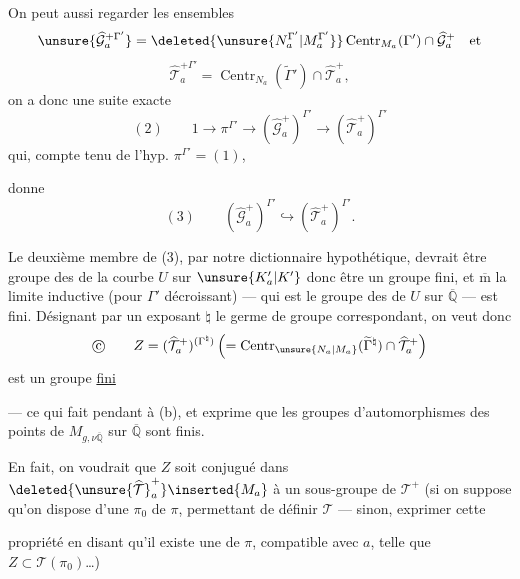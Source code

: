 On peut aussi regarder les ensembles
\[
\unsure{\widehat{\mathcal G}_a^{+\Gamma'}}
=
\deleted{\unsure{N_a^{\Gamma'}|M_a^{\Gamma'}}}
\operatorname{Centr}_{M_a}(\Gamma')\cap\widehat{\mathcal G}_a^+
\quad\text{et}
\]
\[
\widehat{\mathcal T}_a^{+\Gamma'}
=\operatorname{Centr}_{N_a}(\widetilde{\Gamma}')\cap\widehat{\mathcal T}_a^+,
\]
 on a donc une suite exacte
\[
(2)\qquad 1\longrightarrow\pi^{\Gamma'}\longrightarrow
(\widehat{\mathcal G}_a^+)^{\Gamma'}\longrightarrow
(\widehat{\mathcal T}_a^+)^{\Gamma'}
\]
qui, compte tenu de l'hyp. $\pi^{\Gamma'}=(1)$,


donne
\[
(3)\qquad (\widehat{\mathcal G}_a^+)^{\Gamma'}
\hookrightarrow (\widehat{\mathcal T}_a^+)^{\Gamma'}.
\]

Le deuxième membre de (3), par notre dictionnaire hypothétique, devrait être   groupe des  de la courbe $U$ sur $\unsure{K'_a|K'}$ donc être un groupe fini, et $\overline{\mathrm m}$  la limite inductive (pour $\Gamma'$ décroissant) --- qui est le groupe des  de $U$ sur $\overline{\mathbb Q}$ --- est fini. Désignant par un exposant $\natural$ le germe de groupe correspondant, on veut donc
\[
\text{\textcircled{c}}\qquad
Z=(\widehat{\mathcal T}_a^+)^{(\Gamma^{\natural})}
\left(=\operatorname{Centr}_{\unsure{N_a|M_a}}
(\widetilde{\Gamma}^{\natural})\cap\widehat{\mathcal T}_a^+\right)
\]
est un groupe \uline{fini}

--- ce qui fait pendant à (b), et exprime que les groupes d'automorphismes des points de $M_{g,\nu\overline{\mathbb Q}}$ sur $\overline{\mathbb Q}$ sont finis.

En fait, on voudrait que $Z$ soit conjugué dans $\deleted{\unsure{\widehat{\mathcal T}}_a^+}\inserted{M_a}$ à un sous-groupe de  $\mathcal T^+$  (si on suppose qu'on dispose d'une   $\pi_0$ de $\pi$, permettant de définir $\mathcal T$ --- sinon,  exprimer cette


propriété en disant qu'il existe une   de $\pi$, compatible avec $a$, telle que $Z\subset\mathcal T(\pi_0)$\ldots)

